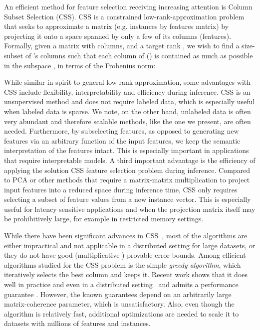 \documentclass{article}
\begin{document}
An efficient method for feature selection receiving increasing attention is Column Subset Selection (CSS). CSS is a constrained low-rank-approximation problem that seeks to approximate a matrix (e.g. instances by features matrix) by projecting it onto a space spanned by only a few of its columns (features). Formally, given a matrix  with  columns, and a target rank , we wish to find a size- subset  of 's columns such that each column  of  () is contained as much as possible in the subspace , in terms of the Frobenius norm:


While similar in spirit to general low-rank approximation, some advantages with CSS include flexibility,
interpretability and efficiency during inference. CSS is an
unsupervised method and does not require labeled data, which is
especially useful when labeled data is sparse.  We note, on the other
hand, unlabeled data is often very abundant and therefore scalable
methods, like the one we present, are often needed.  
Furthermore, by subselecting features, as opposed to generating new
features via an arbitrary function of the input features, we keep the
semantic interpretation of the features intact. This is especially
important in applications that require interpretable models.  A third
important advantage is the efficiency of applying the solution CSS
feature selection problem during inference. Compared to PCA or other
methods that require a matrix-matrix multiplication to project input
features into a reduced space during inference time, CSS only requires
selecting a subset of feature values from a new instance vector. This
is especially useful for latency sensitive applications and when the
projection matrix itself may be prohibitively large, for example in
restricted memory settings.

While there have been significant advances in CSS~\cite{Boutsidis1,Boutsidis2,Guruswami}, most of the algorithms are either impractical and not applicable in a distributed setting for large datasets, or they do not have good (multiplicative ) provable error bounds. 
Among efficient algorithms  studied for the CSS problem is the simple {\em greedy algorithm}, which iteratively selects the best column and keeps it. Recent work shows that it does well in practice and even in a distributed setting~\cite{Farahat1, Farahat2} and admits a performance guarantee \cite{Civril1}. However, the known guarantees depend on an arbitrarily large matrix-coherence parameter, which is unsatisfactory. Also, even though the algorithm is relatively fast, additional optimizations are needed to scale it to datasets with millions of features and instances. 
\end{document}
